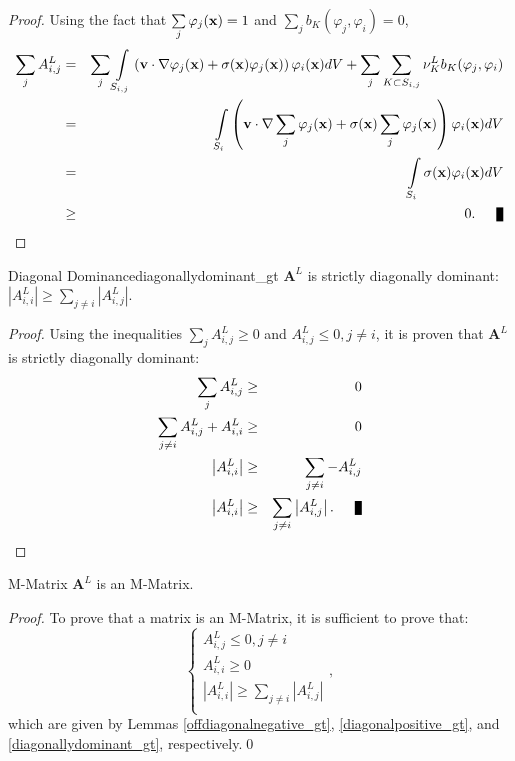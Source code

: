 \begin{proof}
Using the fact that $\sum\limits_j\varphi_j(\mathbf{x})=1$ and
$\sum\limits_j b_K(\varphi_j,\varphi_i)=0$,
\begin{eqnarray*}
   \sumj A^L_{i,j} & = & \sumj \intSij
      \left(\v\cdot\nabla\varphi_j(\x) +
      \sigma(\x)\varphi_j(\x)\right)\varphi_i(\x) dV +
      \sumj\sumKSij\nu_K^L b_K(\varphi_j, \varphi_i)\\
   & = & \intSi\left(\v\cdot
      \nabla\sumj\varphi_j(\x) +
      \sigma(\x)\sumj\varphi_j(\x)\right)
      \varphi_i(\x) dV\\
   \label{gtrowsum} & = & \intSi\sigma(\x)\varphi_i(\x) dV\\
   &\ge& 0.\qed
\end{eqnarray*}
\end{proof}
\begin{lemma}{Diagonal Dominance}{diagonallydominant_gt}
   $\mathbf{A}^L$ is strictly diagonally dominant:
   $\left|A^L_{i,i}\right| \ge \sum\limits_{j\ne i} \left|A^L_{i,j}\right|$.
\end{lemma}
\begin{proof}
Using the inequalities $\sum\limits_j A^L_{i,j} \ge 0$ and $A^L_{i,j}\le 0, j\ne i$,
it is proven that $\mathbf{A}^L$ is strictly diagonally dominant:
\begin{eqnarray*}
	\sum\limits_j A^L_{i,j} & \ge & 0\\
	\sum\limits_{j\ne i} A^L_{i,j} + A^L_{i,i} & \ge & 0\\
	\left|A^L_{i,i}\right| & \ge & \sum\limits_{j\ne i} -A^L_{i,j}\\
	\left|A^L_{i,i}\right| & \ge & \sum\limits_{j\ne i} \left|A^L_{i,j}\right|.\qed
\end{eqnarray*}
\end{proof}
\begin{lemma}{M-Matrix}{}
   $\mathbf{A}^L$ is an M-Matrix.
\end{lemma}
\begin{proof}
To prove that a matrix is an M-Matrix, it is sufficient to prove that:
\[
\left\{\begin{array}{l}
A^L_{i,j}\le 0, j\ne i\\
A^L_{i,i}\ge 0\\
\left|A^L_{i,i}\right| \ge \sum\limits_{j\ne i} \left|A^L_{i,j}\right|\\
\end{array}
\right.,
\]
which are given by Lemmas \ref{offdiagonalnegative_gt}, \ref{diagonalpositive_gt}, and
\ref{diagonallydominant_gt}, respectively.\qed
\end{proof}
